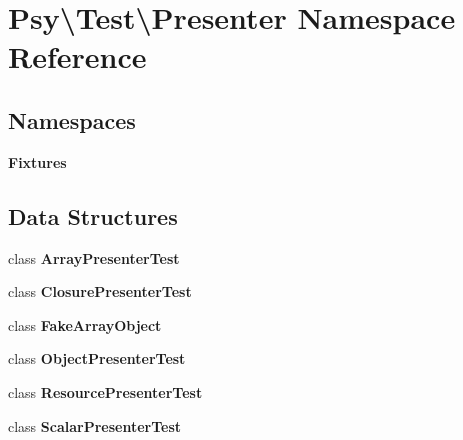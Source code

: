 \section{Psy\textbackslash{}Test\textbackslash{}Presenter Namespace Reference}
\label{namespace_psy_1_1_test_1_1_presenter}
\subsection*{Namespaces}
\begin{DoxyCompactItemize}
\item 
 {\bf Fixtures}
\end{DoxyCompactItemize}
\subsection*{Data Structures}
\begin{DoxyCompactItemize}
\item 
class {\bf Array\+Presenter\+Test}
\item 
class {\bf Closure\+Presenter\+Test}
\item 
class {\bf Fake\+Array\+Object}
\item 
class {\bf Object\+Presenter\+Test}
\item 
class {\bf Resource\+Presenter\+Test}
\item 
class {\bf Scalar\+Presenter\+Test}
\end{DoxyCompactItemize}
